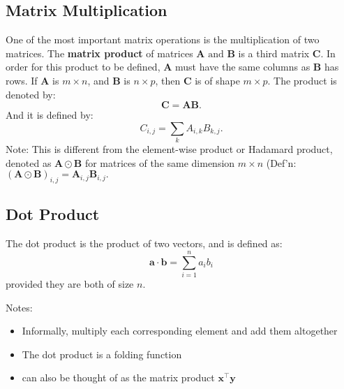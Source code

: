 \documentclass[11pt,twocolumn]{report}
\begin{document}
\subsection{Matrix Multiplication}
One of the most important matrix operations is the multiplication of two matrices. The
\textbf{matrix product} of matrices $\bm{A} \text{ and } \bm{B}$ is a third
matrix $\bm{C}$. In order for this product to be defined, $\bm{A}$ must have
the same columns as $\bm{B}$ has rows. If $\bm{A}$ is $m \times n$, and
$\bm{B}$ is $n \times p$, then $\bm{C}$ is of shape $m \times p$.
The product is denoted by:
\begin{equation}
  \bm{C} = \bm{A}\bm{B}.
\end{equation}
And it is defined by:
\begin{equation}
  C_{i, j} = \sum_k A_{i, k}B_{k, j}.
\end{equation}
Note: This is different from the element-wise product or Hadamard product,
denoted as $\bm{A} \odot \bm{B}$ for matrices of the same dimension $m \times
n$ (Def'n: $(\bm{A} \odot \bm{B})_{i, j} = \bm{A}_{i, j}\bm{B}_{i, j}.$
\subsection{Dot Product}
The dot product is the product of two vectors, and is defined as:
\begin{equation}
  \bm{a} \cdot \bm{b} = \sum_{i = 1}^n a_ib_i
\end{equation}
provided they are both of size $n$.\par
Notes:
\begin{itemize}
  \item Informally, multiply each corresponding element and add them altogether
  \item The dot product is a folding function
  \item can also be thought of as the matrix product $\bm{x}^\intercal\bm{y}$
\end{itemize}
\end{document}
